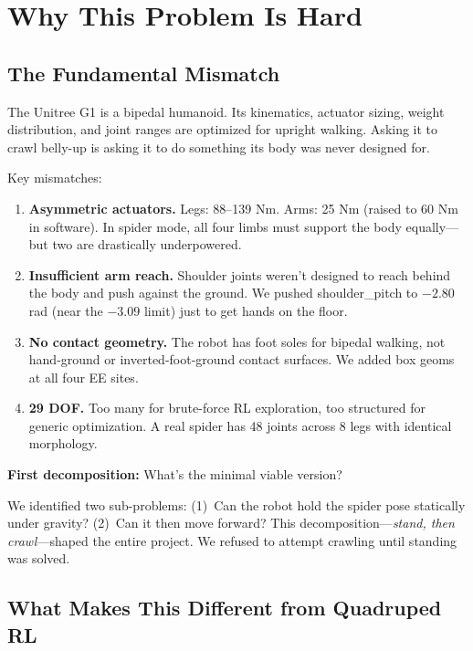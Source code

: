 \documentclass[11pt, a4paper]{article}
\begin{document}
\section{Why This Problem Is Hard}

\subsection{The Fundamental Mismatch}

The Unitree G1 is a bipedal humanoid. Its kinematics, actuator sizing, weight distribution, and joint ranges are optimized for upright walking. Asking it to crawl belly-up is asking it to do something its body was never designed for.

Key mismatches:
\begin{enumerate}[nosep]
\item \textbf{Asymmetric actuators.} Legs: 88--139 Nm. Arms: 25 Nm (raised to 60 Nm in software). In spider mode, all four limbs must support the body equally---but two are drastically underpowered.
\item \textbf{Insufficient arm reach.} Shoulder joints weren't designed to reach behind the body and push against the ground. We pushed shoulder\_pitch to $-2.80$ rad (near the $-3.09$ limit) just to get hands on the floor.
\item \textbf{No contact geometry.} The robot has foot soles for bipedal walking, not hand-ground or inverted-foot-ground contact surfaces. We added box geoms at all four EE sites.
\item \textbf{29 DOF.} Too many for brute-force RL exploration, too structured for generic optimization. A real spider has 48 joints across 8 legs with identical morphology.
\end{enumerate}

\begin{decisionbox}
\textbf{First decomposition:} What's the minimal viable version?

We identified two sub-problems: (1)~Can the robot hold the spider pose statically under gravity? (2)~Can it then move forward? This decomposition---\textit{stand, then crawl}---shaped the entire project. We refused to attempt crawling until standing was solved.
\end{decisionbox}

\subsection{What Makes This Different from Quadruped RL}
\end{document}
